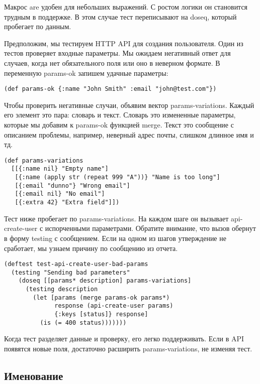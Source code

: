 Макрос are удобен для небольших выражений. С ростом логики он становится трудным
в поддержке. В этом случае тест переписывают на doseq, который пробегает по
данным.

Предположим, мы тестируем HTTP API для создания пользователя. Один из тестов
проверяет входные параметры. Мы ожидаем негативный ответ для случаев, когда нет
обязательного поля или оно в неверном формате. В переменную params-ok запишем
удачные параметры:

\begin{verbatim}
(def params-ok {:name "John Smith" :email "john@test.com"})
\end{verbatim}

Чтобы проверить негативные случаи, объявим вектор params-variations. Каждый его
элемент это пара: словарь и текст. Словарь это измененные параметры, которые мы
добавим к params-ok функцией merge. Текст это сообщение с описанием проблемы,
например, неверный адрес почты, слишком длинное имя и тд.

\begin{verbatim}
(def params-variations
  [[{:name nil} "Empty name"]
   [{:name (apply str (repeat 999 "A"))} "Name is too long"]
   [{:email "dunno"} "Wrong email"]
   [{:email nil} "No email"]
   [{:extra 42} "Extra field"]])
\end{verbatim}

Тест ниже пробегает по params-variations. На каждом шаге он вызывает
api-create-user с испорченными параметрами. Обратите внимание, что вызов обернут
в форму testing с сообщением. Если на одном из шагов утверждение не сработает,
мы узнаем причину по сообщению из отчета.

\begin{verbatim}
(deftest test-api-create-user-bad-params
  (testing "Sending bad parameters"
    (doseq [[params* description] params-variations]
      (testing description
        (let [params (merge params-ok params*)
              response (api-create-user params)
              {:keys [status]} response]
          (is (= 400 status)))))))
\end{verbatim}

Когда тест разделяет данные и проверку, его легко поддерживать. Если в API
появятся новые поля, достаточно расширить params-variations, не изменяя тест.

\subsection{Именование}


